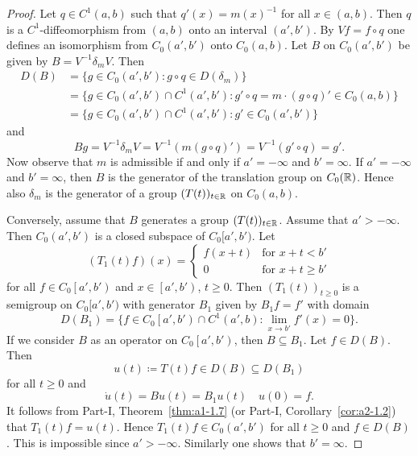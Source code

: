 \begin{proof}
Let $q \in C^{1}(a,b)$ such that $q'(x) = m(x)^{-1}$ for all $x \in (a,b)$.
Then $q$ is a $C^{1}$-diffeomorphism from $(a,b)$ onto an interval $(a',b')$.
By $Vf = f \circ q$ one defines an isomorphism from $C_{0}(a',b')$ onto $C_{0}(a,b)$.
Let $B$ on $C_{0}(a',b')$ be given by $B = V^{-1}\delta_{m}V$.
Then 
\begin{align*}
D(B) &= \{ g \in C_{0}(a',b') \colon g \circ q \in D(\delta_{m}) \} \\
&= \{ g \in C_{0}(a',b') \cap C^{1}(a',b') \colon g' \circ q 
= m \cdot (g \circ q)' \in C_{0}(a,b) \} \\
&= \{ g \in C_{0}(a',b') \cap C^{1}(a',b') \colon g' \in C_{0}(a',b') \}
\end{align*}
and 
%
\[
	Bg = V^{-1}\delta_{m}V = V^{-1}(m(g \circ q)') = V^{-1}(g' \circ q) = g'.
\]
%
Now observe that $m$ is admissible if and only if\/ $a' = -\infty$ and $b' = \infty$.
If\/ $a' = -\infty$ and $b' = \infty$, then $B$ is the generator of the translation group on $C_{0}(\mathbb{R})$.
Hence also $\delta_{m}$ is the generator of a group $(T(t))_{t \in \mathbb{R}}$ on $C_{0}(a,b)$.

Conversely, assume that $B$ generates a group $(T(t))_{t \in \mathbb{R}}$.
Assume that $a' > -\infty$.
Then $C_{0}(a',b')$ is a closed subspace of\/ $C_{0}[a',b')$.
Let
\begin{equation*}\label{eq:b2-t1}
(T_{1}(t)f)(x) = \begin{cases}
    f(x+t) & \text{for } x+t < b' \\
    0 & \text{for } x+t \geq b'
\end{cases}
\end{equation*}
for all $f \in C_{0}\left[a',b'\right)$ and $x \in \left[a',b'\right)$, $t \geq 0$.
Then $(T_{1}(t))_{t \geq 0}$ is a semigroup on $C_{0}[a',b')$ with generator $B_{1}$ given by 
$B_{1}f = f'$ with domain 
\[
D(B_{1}) = \{ f \in C_{0}\left[a',b'\right) \cap C^{1}(a',b) \colon \lim_{x \to b'} f'(x) = 0 \}.
\]
If we consider $B$ as an operator on $C_{0}\left[a',b'\right)$, then $B \subseteq B_{1}$.
Let $f \in D(B)$.
Then 
%
\[
	 u(t) \coloneq T(t)f \in D(B) \subseteq D(B_{1}) 
\]
%
for all $t \geq 0$ and 
%
\[
	\dot{u}(t) = Bu(t) = B_{1}u(t) \quad u(0) = f.
\]
%
It follows from Part-I, Theorem~\ref{thm:a1-1.7} (or Part-I, Corollary~\ref{cor:a2-1.2})
that $T_{1}(t)f = u(t)$.
Hence $T_{1}(t)f \in C_{0}(a',b')$ for all $t \geq 0$ and $f \in D(B)$.
This is impossible since $a' > -\infty$.
Similarly one shows that $b' = \infty$.
\end{proof}
